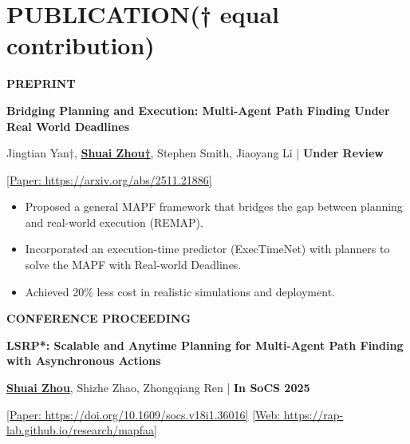 \documentclass[a4paper,9pt]{extarticle}
\begin{document}
\section*{{\textbf{\fontsize{14pt}{8pt}\selectfont P}\textbf{\scshape UBLICATION}}(† equal contribution)}
{\textbf{\fontsize{12pt}{4pt}\selectfont P}\textbf{\scshape REPRINT}}
\par\vspace{4pt}\noindent
\par\textbf{Bridging Planning and Execution: Multi-Agent Path Finding Under Real World Deadlines}
\par\textup{Jingtian Yan†, \underline{\textbf{Shuai Zhou†}}, Stephen Smith, Jiaoyang Li  \hfill | \textbf{Under Review}}
\par\textup{\textbar{} \href{https://arxiv.org/abs/2511.21886}{[Paper: https://arxiv.org/abs/2511.21886]} \textbar{}} 
\begin{itemize} 
    \item Proposed a general MAPF framework that bridges the gap between planning and real-world execution (REMAP). 
    \item Incorporated an execution-time predictor (ExecTimeNet) with planners to solve the MAPF with Real-world Deadlines.
    \item Achieved 20\% less cost in realistic simulations and deployment.
\end{itemize} 
{\textbf{\fontsize{12pt}{4pt}\selectfont C}\textbf{\scshape ONFERENCE PROCEEDING}}
\par\vspace{4pt}\noindent
\par\textbf{LSRP*: Scalable and Anytime Planning for Multi-Agent Path Finding with Asynchronous Actions}
\par\textup{\underline{\textbf{Shuai Zhou}}, Shizhe Zhao, Zhongqiang Ren  \hfill | \textbf{In SoCS 2025}}   %
\par\textup{\textbar{} \href{https://doi.org/10.1609/socs.v18i1.36016}{[Paper: https://doi.org/10.1609/socs.v18i1.36016]} \textbar{} \href{https://rap-lab.github.io/research/mapfaa}{[Web: https://rap-lab.github.io/research/mapfaa]} \textbar{}}
\end{document}
